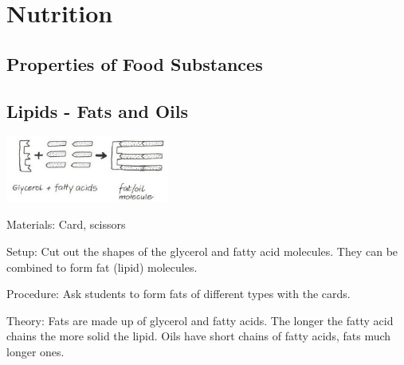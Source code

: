 \section{Nutrition}

\begin{multicols}{2}




\section*{Properties of Food Substances}


\subsection{Lipids - Fats and Oils} %

\begin{center}
\includegraphics[width=0.4\textwidth]{./img/vso/lipids.jpg}
\end{center}

\begin{description*}
\item[Materials:]{Card, scissors}
\item[Setup:]{Cut out the shapes of the glycerol and fatty acid molecules. They can be
combined to form fat (lipid) molecules.}
\item[Procedure:]{Ask students to form fats of different types with the cards. }
\item[Theory:]{Fats are made up of glycerol and fatty acids. The longer the fatty acid chains
the more solid the lipid. Oils have short chains of fatty acids, fats much
longer ones.}
\end{description*}


\end{multicols}
